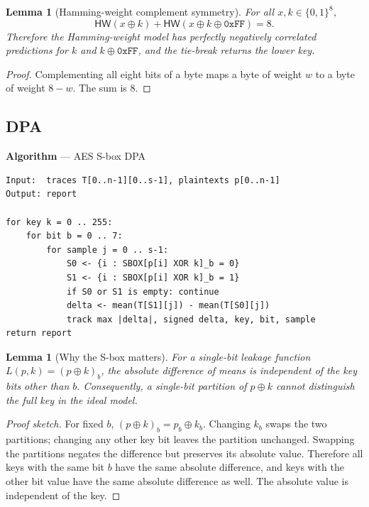 \documentclass[11pt,a4paper]{article}
\newcommand{\bits}{\{0,1\}}
\newcommand{\HW}{\mathsf{HW}}
\theoremstyle{plain}
\newtheorem{lemma}[theorem]{Lemma}
\theoremstyle{definition}
\theoremstyle{remark}
\newcounter{algblock}
\newenvironment{algorithmblock}[1]{%
  \par\medskip\refstepcounter{algblock}%
  \noindent\textbf{Algorithm \thealgblock} --- #1\par\nopagebreak
  \noindent\begin{minipage}{\linewidth}\small
}{%
  \end{minipage}\par\medskip
}
\begin{document}
\begin{lemma}[Hamming-weight complement symmetry]\label{lem:hw}
For all \(x,k\in\bits^8\),
\[
  \HW(x\oplus k) + \HW(x\oplus k\oplus \texttt{0xFF}) = 8.
\]
Therefore the Hamming-weight model has perfectly negatively correlated predictions for
\(k\) and \(k\oplus\texttt{0xFF}\), and the tie-break returns the lower key.
\end{lemma}

\begin{proof}
Complementing all eight bits of a byte maps a byte of weight \(w\) to a byte of weight
\(8-w\). The sum is 8.
\end{proof}

\subsection{DPA}

\begin{algorithmblock}{AES S-box DPA}
\begin{verbatim}
Input:  traces T[0..n-1][0..s-1], plaintexts p[0..n-1]
Output: report

for key k = 0 .. 255:
    for bit b = 0 .. 7:
        for sample j = 0 .. s-1:
            S0 <- {i : SBOX[p[i] XOR k]_b = 0}
            S1 <- {i : SBOX[p[i] XOR k]_b = 1}
            if S0 or S1 is empty: continue
            delta <- mean(T[S1][j]) - mean(T[S0][j])
            track max |delta|, signed delta, key, bit, sample
return report
\end{verbatim}
\end{algorithmblock}

\begin{lemma}[Why the S-box matters]\label{lem:sbox}
For a single-bit leakage function \(L(p,k)=(p\oplus k)_b\), the absolute difference of
means is independent of the key bits other than \(b\). Consequently, a single-bit
partition of \(p\oplus k\) cannot distinguish the full key in the ideal model.
\end{lemma}

\begin{proof}[Proof sketch]
For fixed \(b\), \((p\oplus k)_b=p_b\oplus k_b\). Changing \(k_b\) swaps the two
partitions; changing any other key bit leaves the partition unchanged. Swapping the
partitions negates the difference but preserves its absolute value. Therefore all keys
with the same bit \(b\) have the same absolute difference, and keys with the other bit
value have the same absolute difference as well. The absolute value is independent of
the key.
\end{proof}
\end{document}
